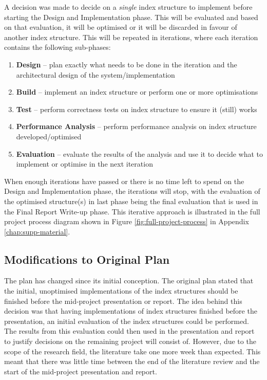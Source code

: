 A decision was made to decide on a \textit{single} index structure to implement before starting the Design and Implementation phase. This will be evaluated and based on that evaluation, it will be optimised or it will be discarded in favour of another index structure. This will be repeated in iterations, where each iteration contains the following sub-phases:
\begin{enumerate}
	\item \textbf{Design} -- plan exactly what needs to be done in the iteration and the architectural design of the system/implementation
	\item \textbf{Build} -- implement an index structure or perform one or more optimisations
	\item \textbf{Test} -- perform correctness tests on index structure to ensure it (still) works
	\item \textbf{Performance Analysis} -- perform performance analysis on index structure developed/optimised
	\item \textbf{Evaluation} -- evaluate the results of the analysis and use it to decide what to implement or optimise in the next iteration
\end{enumerate}
When enough iterations have passed or there is no time left to spend on the Design and Implementation phase, the iterations will stop, with the evaluation of the optimised structure(s) in last phase being the final evaluation that is used in the Final Report Write-up phase. This iterative approach is illustrated in the full project process diagram shown in Figure \ref{fig:full-project-process} in Appendix \ref{chap:supp-material}.

\subsection{Modifications to Original Plan}

The plan has changed since its initial conception. The original plan stated that the initial, unoptimised implementations of the index structures should be finished before the mid-project presentation or report. The idea behind this decision was that having implementations of index structures finished before the presentation, an initial evaluation of the index structures could be performed. The results from this evaluation could then used in the presentation and report to justify decisions on the remaining project will consist of. However, due to the scope of the research field, the literature take one more week than expected. This meant that there was little time between the end of the literature review and the start of the mid-project presentation and report.

